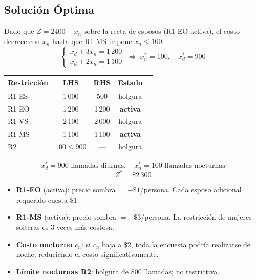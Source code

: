 \documentclass[12pt,a4paper]{article}
\begin{document}
\subsection{Solución Óptima}

Dado que $Z = 2400 - x_n$ sobre la recta de esposos (R1-EO activa), el costo
decrece con $x_n$ hasta que R1-MS impone $x_n \leq 100$:
\[
  \begin{cases} x_d + 3x_n = 1\,200 \\ x_d + 2x_n = 1\,100 \end{cases}
  \;\Rightarrow\; x_n^* = 100,\quad x_d^* = 900
\]

\begin{center}
\renewcommand{\arraystretch}{1.3}
\begin{tabular}{@{}lcccc@{}}
\toprule
\textbf{Restricción} & \textbf{LHS} & \textbf{RHS} & \textbf{Estado}\\
\midrule
R1-ES & 1\,000 & 500   & holgura\\
R1-EO & 1\,200 & 1\,200 & \textbf{activa}\\
R1-VS & 2\,100 & 2\,000 & holgura\\
R1-MS & 1\,100 & 1\,100 & \textbf{activa}\\
R2    & $100 \leq 900$ & — & holgura\\
\bottomrule
\end{tabular}
\end{center}

\begin{solucbox}
\[
  x_d^* = 900\text{ llamadas diurnas},\quad x_n^* = 100\text{ llamadas nocturnas}
\]
\[
  \boxed{Z^* = \$2\,300}
\]
\end{solucbox}

\begin{sensbox}
\begin{itemize}[leftmargin=1.5em]
  \item \textbf{R1-EO} (activa): precio sombra $= -\$1$/persona.
    Cada esposo adicional requerido cuesta \$1.
  \item \textbf{R1-MS} (activa): precio sombra $= -\$3$/persona.
    La restricción de mujeres solteras es 3 veces más costosa.
  \item \textbf{Costo nocturno $c_n$}: si $c_n$ baja a \$2, toda la encuesta podría
    realizarse de noche, reduciendo el costo significativamente.
  \item \textbf{Límite nocturnas R2}: holgura de 800 llamadas; no restrictiva.
\end{itemize}
\end{sensbox}
\end{document}
